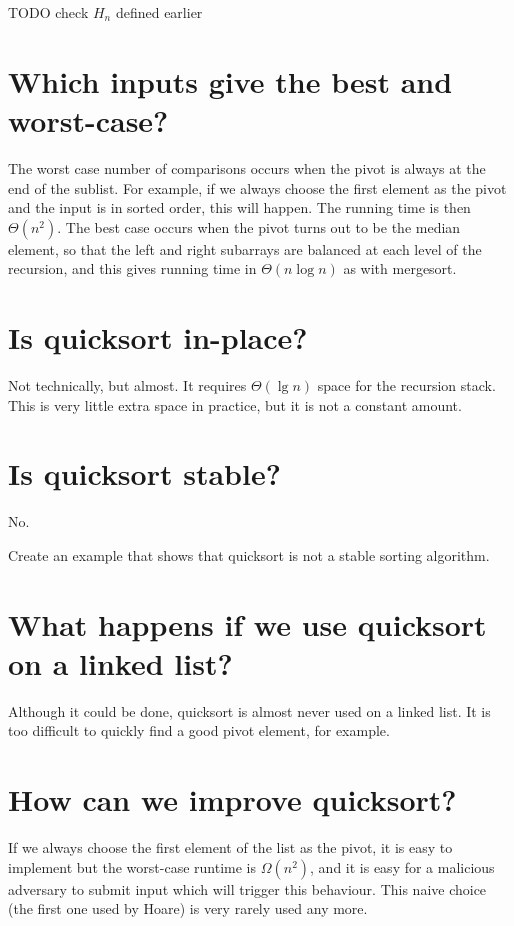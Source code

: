 TODO check $H_n$ defined earlier


\section{Which inputs give the best and worst-case?}
The worst case number of comparisons occurs when the pivot is always at the end of the sublist. For example, if we always choose the first element as the pivot and the input is in sorted order, this will happen. The running time is then $\Theta(n^2)$. The best case occurs when the pivot turns out to be the median element, so that the left and right subarrays are balanced at each level of the recursion, and this gives running time in $\Theta(n\log n)$ as with mergesort.

\section{Is quicksort in-place?}
Not technically, but almost. It requires $\Theta(\lg n)$ space for the recursion stack. This is very little extra space in practice, but it is not a constant amount.


\section{Is quicksort stable?}
No.
\begin{Boxample}[5]
Create an example that shows that quicksort is not a stable sorting algorithm.

\end{Boxample}



\section{What happens if we  use quicksort on a linked list?}
Although it could be done, quicksort is almost never used on a linked list. It is too difficult to quickly find a good pivot element, for example.

\section{How can we improve quicksort?}

If we always choose the first element of the list as the pivot, it is easy to implement but
the worst-case runtime is $\Omega(n^2)$, and it is easy for a malicious adversary to submit input 
which will trigger this behaviour. This naive choice (the first one used by Hoare) is very rarely used any more.


